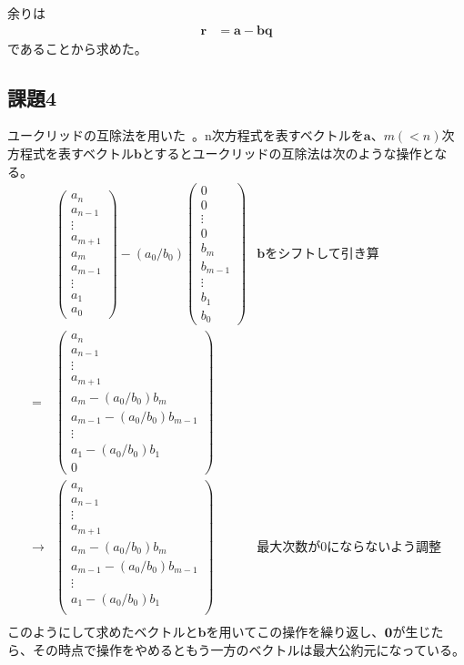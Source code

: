\documentclass{jsarticle}
\begin{document}
余りは
\begin{align}
	\bm{r} &= \bm{a} - \bm{b} \bm{q}
\end{align}
であることから求めた。
\subsection{課題4}
ユークリッドの互除法を用いた~\cite{ユークリッド}。n次方程式を表すベクトルを$\bm{a}$、$m(< n)$次方程式を表すベクトル$\bm{b}$とするとユークリッドの互除法は次のような操作となる。
\begin{align}&
\begin{pmatrix}
	a_n \\
	a_{n-1} \\
	\vdots \\
	a_{m+1} \\
	a_m \\
	a_{m-1} \\
	\vdots \\
	a_1 \\
	a_0
\end{pmatrix} - (a_0/b_0)
\begin{pmatrix}
	0 \\
	0 \\
	\vdots \\
	0 \\
	b_m \\
	b_{m-1} \\
	\vdots \\
	b_1 \\
	b_0
\end{pmatrix} & \text{$\bm{b}$をシフトして引き算}\\
=&
\begin{pmatrix}
	a_n \\
	a_{n-1} \\
	\vdots \\
	a_{m+1} \\
	a_m - (a_0/b_0) b_m \\
	a_{m-1} - (a_0/b_0) b_{m-1} \\
	\vdots \\
	a_1 - (a_0/b_0)b_1 \\
	0
\end{pmatrix} \\
\to&
\begin{pmatrix}
	a_n \\
	a_{n-1} \\
	\vdots \\
	a_{m+1} \\
	a_m - (a_0/b_0) b_m \\
	a_{m-1} - (a_0/b_0) b_{m-1} \\
	\vdots \\
	a_1 - (a_0/b_0)b_1 \\
\end{pmatrix} & \text{最大次数が0にならないよう調整}\\
\end{align}
このようにして求めたベクトルと$\bm{b}$を用いてこの操作を繰り返し、$\bf{0}$が生じたら、その時点で操作をやめるともう一方のベクトルは最大公約元になっている。
\end{document}
